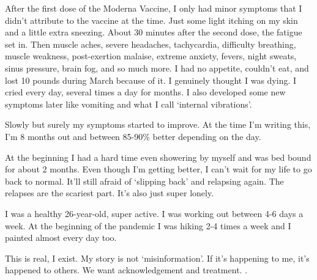 After the first dose of the Moderna Vaccine, I only had minor symptoms that I
didn’t attribute to the vaccine at the time. Just some light itching on my skin
and a little extra sneezing. About 30 minutes after the second dose, the fatigue
set in. Then muscle aches, severe headaches, tachycardia, difficulty breathing,
muscle weakness, post-exertion malaise, extreme anxiety, fevers, night sweats,
sinus pressure, brain fog, and so much more. I had no appetite, couldn’t eat,
and lost 10 pounds during March because of it. I genuinely thought I was
dying. I cried every day, several times a day for months. I also developed some
new symptoms later like vomiting and what I call ‘internal vibrations’.

Slowly but surely my symptoms started to improve. At the time I’m writing this,
I’m 8 months out and between 85-90\% better depending on the day.

At the beginning I had a hard time even showering by myself and was bed bound
for about 2 months. Even though I’m getting better, I can’t wait for my life to
go back to normal. It’ll still afraid of ‘slipping back’ and relapsing
again. The relapses are the scariest part. It’s also just super lonely.

I was a healthy 26-year-old, super active. I was working out between 4-6 days a
week. At the beginning of the pandemic I was hiking 2-4 times a week and I
painted almost every day too.

This is real, I exist. My story is not ‘misinformation’. If it’s happening to
me, it’s happened to others. We want acknowledgement and treatment. .
